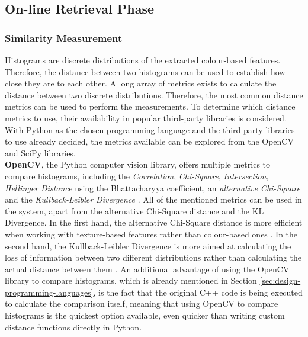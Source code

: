 
\subsection{On-line Retrieval Phase}
\label{sec:design-online-retrieval}

\subsubsection{Similarity Measurement}
\label{sec:design-online-retrieval-similarity-measurement}

Histograms are discrete distributions of the extracted colour-based features. Therefore, the distance between two histograms can be used to establish how close they are to each other. A long array of metrics exists to calculate the distance between two discrete distributions. Therefore, the most common distance metrics can be used to perform the measurements. To determine which distance metrics to use, their availability in popular third-party libraries is considered. With Python as the chosen programming language and the third-party libraries to use already decided, the metrics available can be explored from the OpenCV and SciPy libraries.\\

\textbf{OpenCV}, the Python computer vision library, offers multiple metrics to compare histograms, including the \textit{Correlation}, \textit{Chi-Square}, \textit{Intersection}, \textit{Hellinger Distance} using the Bhattacharyya coefficient, an \textit{alternative Chi-Square} and the \textit{Kullback-Leibler Divergence} \cite{opencv-histcomp}. All of the mentioned metrics can be used in the system, apart from the alternative Chi-Square distance and the KL Divergence. In the first hand, the alternative Chi-Square distance is more efficient when working with texture-based features rather than colour-based ones \cite{puzicha1997non}. In the second hand, the Kullback-Leibler Divergence is more aimed at calculating the loss of information between two different distributions rather than calculating the actual distance between them \cite{kurt2007kldivergence}. An additional advantage of using the OpenCV library to compare histograms, which is already mentioned in Section \ref{sec:design-programming-languages}, is the fact that the original C++ code is being executed to calculate the comparison itself, meaning that using OpenCV to compare histograms is the quickest option available, even quicker than writing custom distance functions directly in Python.\\

